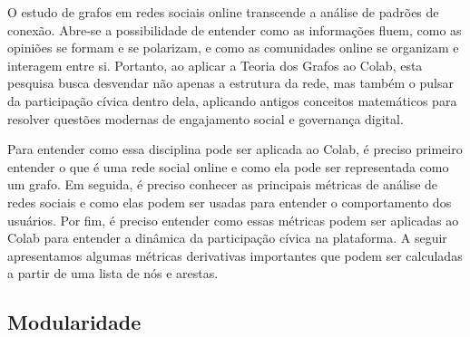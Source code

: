 O estudo de grafos em redes sociais online transcende a análise de padrões de conexão. Abre-se a possibilidade de entender como as informações fluem, como as opiniões se formam e se polarizam, e como as comunidades online se organizam e interagem entre si. Portanto, ao aplicar a Teoria dos Grafos ao Colab, esta pesquisa busca desvendar não apenas a estrutura da rede, mas também o pulsar da participação cívica dentro dela, aplicando antigos conceitos matemáticos para resolver questões modernas de engajamento social e governança digital.

Para entender como essa disciplina pode ser aplicada ao Colab, é preciso primeiro entender o que é uma rede social online e como ela pode ser representada como um grafo. Em seguida, é preciso conhecer as principais métricas de análise de redes sociais e como elas podem ser usadas para entender o comportamento dos usuários. Por fim, é preciso entender como essas métricas podem ser aplicadas ao Colab para entender a dinâmica da participação cívica na plataforma. A seguir apresentamos algumas métricas derivativas importantes que podem ser calculadas a partir de uma lista de nós e arestas.

\subsection*{Modularidade}

